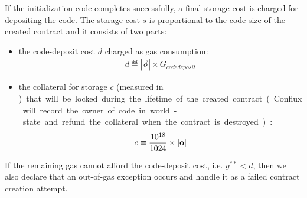 If the initialization code completes successfully,
a final storage cost is charged for depositing the code.
The storage cost $s$ is proportional to the code size of the created contract and it consists of two parts:
\begin{itemize}
	\item the code-deposit cost $d$ charged as gas consumption:
	\begin{align}
		d \eqdef   |\vec{o}| \times G_{codedeposit}
	\end{align}

	\item the collateral for storage $c$ (measured in \unit) that will be locked during the lifetime of the created contract (Conflux will record the owner of code in world-state and refund the collateral when the contract is destroyed):
	\begin{align}
		c \equiv   \frac{10^{18}}{1024} \times |\mathbf{o}|
	\end{align}
\end{itemize}



If the remaining gas cannot afford the code-deposit cost, i.e. $g^{**}<d$, then we also declare that an out-of-gas exception occurs and handle it as a failed contract creation attempt.
%



